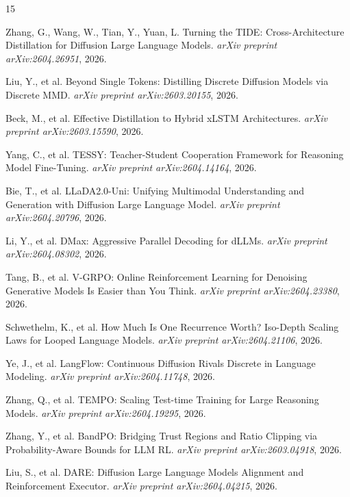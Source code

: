 \documentclass[11pt]{article}
\begin{document}
\begin{thebibliography}{15}

Zhang, G., Wang, W., Tian, Y., Yuan, L.
\newblock Turning the TIDE: Cross-Architecture Distillation for Diffusion Large Language Models.
\newblock \emph{arXiv preprint arXiv:2604.26951}, 2026.

Liu, Y., et al.
\newblock Beyond Single Tokens: Distilling Discrete Diffusion Models via Discrete MMD.
\newblock \emph{arXiv preprint arXiv:2603.20155}, 2026.

Beck, M., et al.
\newblock Effective Distillation to Hybrid xLSTM Architectures.
\newblock \emph{arXiv preprint arXiv:2603.15590}, 2026.

Yang, C., et al.
\newblock TESSY: Teacher-Student Cooperation Framework for Reasoning Model Fine-Tuning.
\newblock \emph{arXiv preprint arXiv:2604.14164}, 2026.

Bie, T., et al.
\newblock LLaDA2.0-Uni: Unifying Multimodal Understanding and Generation with Diffusion Large Language Model.
\newblock \emph{arXiv preprint arXiv:2604.20796}, 2026.

Li, Y., et al.
\newblock DMax: Aggressive Parallel Decoding for dLLMs.
\newblock \emph{arXiv preprint arXiv:2604.08302}, 2026.

Tang, B., et al.
\newblock V-GRPO: Online Reinforcement Learning for Denoising Generative Models Is Easier than You Think.
\newblock \emph{arXiv preprint arXiv:2604.23380}, 2026.

Schwethelm, K., et al.
\newblock How Much Is One Recurrence Worth? Iso-Depth Scaling Laws for Looped Language Models.
\newblock \emph{arXiv preprint arXiv:2604.21106}, 2026.

Ye, J., et al.
\newblock LangFlow: Continuous Diffusion Rivals Discrete in Language Modeling.
\newblock \emph{arXiv preprint arXiv:2604.11748}, 2026.

Zhang, Q., et al.
\newblock TEMPO: Scaling Test-time Training for Large Reasoning Models.
\newblock \emph{arXiv preprint arXiv:2604.19295}, 2026.

Zhang, Y., et al.
\newblock BandPO: Bridging Trust Regions and Ratio Clipping via Probability-Aware Bounds for LLM RL.
\newblock \emph{arXiv preprint arXiv:2603.04918}, 2026.

Liu, S., et al.
\newblock DARE: Diffusion Large Language Models Alignment and Reinforcement Executor.
\newblock \emph{arXiv preprint arXiv:2604.04215}, 2026.

\end{thebibliography}
\end{document}
